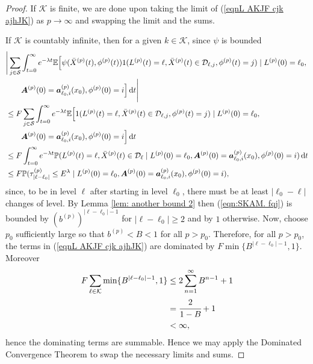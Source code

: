 \begin{proof}
	If \(\mathcal K\) is finite, we are done upon taking the limit of (\ref{eqnL AKJF cjk ajhJK}) as \(p\to\infty\) and swapping the limit and the sums. 
	
	If \(\mathcal K\) is countably infinite, then for a given \(k\in\mathcal K\), since \(\psi\) is bounded
	\begin{align}
		&\Bigg|\sum_{j\in\mathcal S}\int_{t=0}^\infty e^{-\lambda t}\mathbb E\Big[\psi(\bar X^{(p)}(t),\phi^{(p)}(t)) 1(L^{(p)}(t)=\ell, \bar X^{(p)}(t) \in \mathcal D_{\ell,j},\phi^{(p)}(t)=j)  \mid L^{(p)}(0)=\ell_0, \nonumber 
		\\&\qquad{} \boldsymbol A^{(p)}(0)=\boldsymbol  a_{\ell_0,i}^{(p)}(x_0), \phi^{(p)}(0)=i \Big] \, \mathrm{d} t\Bigg| \nonumber 
		\\&\leq F \sum_{j\in\mathcal S}\int_{t=0}^\infty e^{-\lambda t}\mathbb E\Big[ 1(L^{(p)}(t)=\ell, \bar X^{(p)}(t) \in \mathcal D_{\ell,j},\phi^{(p)}(t)=j)  \mid L^{(p)}(0)=\ell_0, \nonumber 
		\\&\qquad{} \boldsymbol A^{(p)}(0)=\boldsymbol  a_{\ell_0,i}^{(p)}(x_0), \phi^{(p)}(0)=i \Big] \, \mathrm{d} t \nonumber 
		\\&\leq F  \int_{t=0}^\infty e^{-\lambda t}\mathbb P( L^{(p)}(t)=\ell, \bar X^{(p)}(t) \in \mathcal D_{\ell} \mid L^{(p)}(0)=\ell_0,  
		\boldsymbol A^{(p)}(0)=\boldsymbol  a_{\ell_0,i}^{(p)}(x_0), \phi^{(p)}(0)=i )\, \mathrm{d} t \nonumber 
		\\&\leq F \mathbb P(\tau_{|\ell-\ell_0|}^{(p)}\leq E^\lambda \mid L^{(p)}(0)=\ell_0,  
			\boldsymbol A^{(p)}(0)=\boldsymbol  a_{\ell_0,i}^{(p)}(x_0), \phi^{(p)}(0)=i), \label{eqn:SKAM. fqj}
	\end{align}
	since, to be in level \(\ell\) after starting in level \(\ell_0\), there must be at least \(|\ell_0-\ell|\) changes of level. By Lemma \ref{lem: another bound 2} then (\ref{eqn:SKAM. fqj}) is bounded by \(\left(b^{(p)}\right)^{|\ell-\ell_0|-1}\) for \(|\ell-\ell_0|\geq 2\) and by \(1\) otherwise. Now, choose \(p_0\) sufficiently large so that \(b^{(p)}<B<1\) for all \(p>p_0\). Therefore, for all \(p>p_0\), the terms in (\ref{eqnL AKJF cjk ajhJK}) are dominated by \(F\min\{B^{|\ell-\ell_0|-1},1\}\). Moreover 
	\begin{align*}
		F\sum_{\ell\in\mathcal K} \min\{B^{|\ell-\ell_0|-1},1\} 
		&\leq2\sum_{n=1}^\infty B^{n-1}+1
		\\&=\cfrac{2}{1-B}+1
		\\&<\infty,
	\end{align*}
	hence the dominating terms are summable. Hence we may apply the Dominated Convergence Theorem to swap the necessary limits and sums. 
\end{proof}

